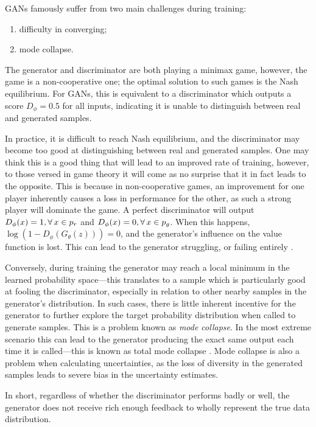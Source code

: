 \documentclass[fleqn,usenatbib]{mnras}
\begin{document}
GANs famously suffer from two main challenges during training:
\begin{enumerate}\label{list:training_difficulties}
	\item difficulty in converging;
	\item mode collapse.
\end{enumerate}

The generator and discriminator are both playing a minimax game, however, the game is a non-cooperative one; the optimal solution to such games is the Nash equilibrium. 
For GANs, this is equivalent to a discriminator which outputs a score $D_\phi = 0.5$ for all inputs, indicating it is unable to distinguish between real and generated samples.

In practice, it is difficult to reach Nash equilibrium, and the discriminator may become too good at distinguishing between real and generated samples. One may think 
this is a good thing that will lead to an improved rate of training, however, to those versed in game theory it will come as no surprise that it in fact leads to the opposite. 
This is because in non-cooperative games, an improvement for one player inherently causes a loss in performance for the other, as such a strong player will dominate the game. 
A perfect discriminator will output $D_\phi(x) = 1, \space \forall \, x \in p_{r}$ and $D_\phi(x) = 0,  \space \forall \, x \in p_g$.
When this happens, $\log(1 - D_\phi(G_\theta(z))) = 0$, and the generator's influence on the value function is lost. This can lead 
to the generator struggling, or failing entirely \citep{arjovsky2017principled}. 

Conversely, during training the generator may reach a local minimum in the learned probability space---this translates to a sample which is 
particularly good at fooling the discriminator, especially in relation to other nearby samples in the generator's distribution. 
In such cases, there is little inherent incentive for the generator to further explore the target probability distribution when called to generate samples. 
This is a problem known as \textit{mode collapse}. In the most extreme scenario this can lead to the generator producing 
the exact same output each time it is called---this is known as total mode collapse \citep{metz2016unrolled}. Mode collapse is also a problem when calculating uncertainties, as the loss of diversity in the generated samples leads to severe bias in the uncertainty estimates.

In short, regardless of whether the discriminator performs badly or well, the generator does not receive rich enough feedback to wholly represent the true data distribution.
\end{document}
